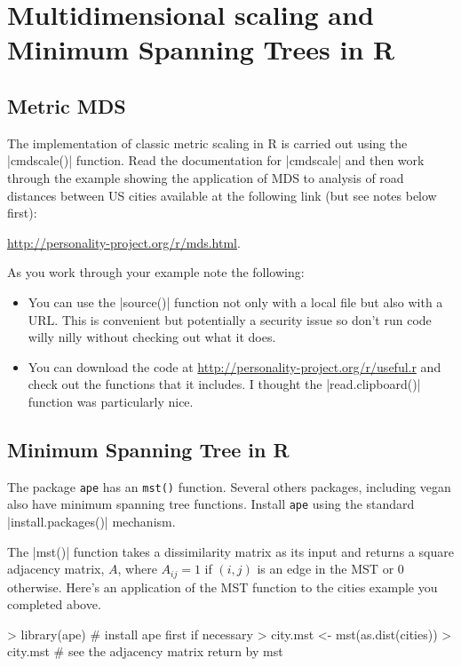 \section{Multidimensional scaling and Minimum Spanning Trees in R}

\subsection{Metric MDS}

The implementation of classic metric scaling in R is carried out using the |cmdscale()| function. Read the documentation for |cmdscale| and then work through the example showing the application of MDS to analysis of road distances between US cities available at the following link (but see notes below first):

\href{http://personality-project.org/r/mds.html}{http://personality-project.org/r/mds.html}.

\medskip
As you work through your example note the following:

\begin{itemize}
\item You can use the |source()| function not only with a local file but also with a URL.  This is convenient but potentially a security issue so don't run code willy nilly without checking out what it does.

\item You can download the code at \href{http://personality-project.org/r/useful.r}{http://personality-project.org/r/useful.r} and check out the functions that it includes. I thought the |read.clipboard()| function was particularly nice.
\end{itemize}

\subsection{Minimum Spanning Tree in R}

The package \texttt{ape} has an \texttt{mst()} function. Several others packages, including vegan also have minimum spanning tree functions. Install \texttt{ape} using the standard |install.packages()| mechanism.

The |mst()| function takes a dissimilarity matrix as its input and returns a square adjacency matrix, $A$, where $A_{ij} = 1$ if $(i,j)$ is an edge in the MST or 0 otherwise. Here's an application of the MST function to the cities example you completed above.
%
\begin{R}
> library(ape) # install ape first if necessary
> city.mst <- mst(as.dist(cities))
> city.mst # see the adjacency matrix return by mst
\end{R}

